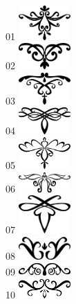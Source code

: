 \documentclass[a5paper]{letter}
\begin{document}
{{{{01 \includegraphics[width=0.15\textwidth]{../../images/artsdecos/ornement01whiteBG.png}~\\
02 \includegraphics[width=0.15\textwidth]{../../images/artsdecos/ornement02whiteBG.png}~\\
03 \includegraphics[width=0.15\textwidth]{../../images/artsdecos/ornement03whiteBG.png}~\\
04 \includegraphics[width=0.15\textwidth]{../../images/artsdecos/ornement04whiteBG.png}~\\
05 \includegraphics[width=0.15\textwidth]{../../images/artsdecos/ornement05whiteBG.png}~\\
06 \includegraphics[width=0.15\textwidth]{../../images/artsdecos/ornement06whiteBG.png}~\\
07 \includegraphics[width=0.15\textwidth]{../../images/artsdecos/ornement07whiteBG.png}~\\
08 \includegraphics[width=0.15\textwidth]{../../images/artsdecos/ornement08whiteBG.png}~\\
09 \includegraphics[width=0.15\textwidth]{../../images/artsdecos/ornement09whiteBG.png}~\\
10 \includegraphics[width=0.15\textwidth]{../../images/artsdecos/ornement10whiteBG.png}~\\

}}}}
\end{document}
